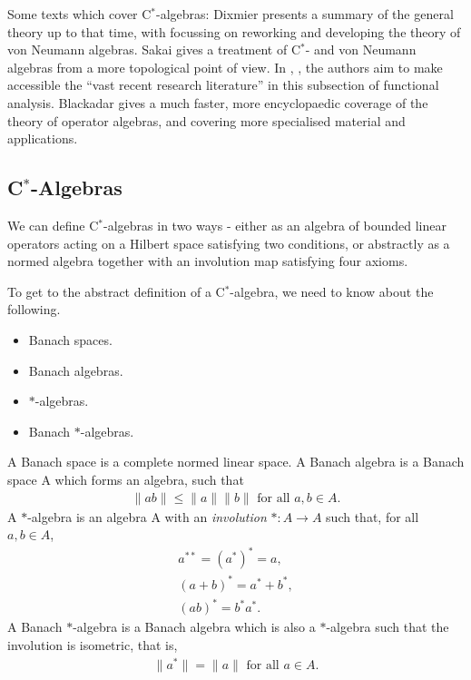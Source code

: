 \documentclass[12pt,a4paper]{amsart}
\theoremstyle{plain}
\theoremstyle{definition}
\begin{document}
	Some texts which cover C$^\ast$-algebras: 
	Dixmier \cite{dixmier77} presents a summary of the general theory up to that time, with \cite{dixmier81} focussing on reworking and developing the theory of von Neumann algebras. 
	Sakai \cite{sakai71} gives a treatment of C$^\ast$- and von Neumann algebras from a more topological point of view.
	In \cite{kadison83}, \cite{kadison86}, the authors aim to make accessible the ``vast recent research literature'' in this subsection of functional analysis.
	Blackadar \cite{blackadar06} gives a much faster, more encyclopaedic coverage of the theory of operator algebras, and covering more specialised material and applications.
	

	
\subsection{C$^\ast$-Algebras}
We can define C$^\ast$-algebras in two ways - either as an algebra of bounded linear operators acting on a Hilbert space satisfying two conditions, or abstractly as a normed algebra together with an involution map satisfying four axioms.

\iftrue
	To get to the abstract definition of a C$^\ast$-algebra, we need to know about the following.
\begin{itemize}
	\item Banach spaces.
	\item Banach algebras.
	\item $\ast$-algebras.
	\item Banach $\ast$-algebras.
\end{itemize}

A Banach space is a complete normed linear space. 
A Banach algebra is a Banach space A which forms an algebra, such that 
\begin{align*}
	\|ab\| \leq \|a\| \|b\| \mbox{ for all } a,b \in A.
\end{align*}
A $\ast$-algebra is an algebra A with an \emph{involution} $\ast : A \to A $ such that, for all $a,b \in A$,
\begin{align*}
	 a^{\ast\ast} = (a^\ast)^\ast = a,\\
	(a+b)^\ast = a^\ast + b^\ast,\\	
	(ab)^\ast = b^\ast a^\ast.
\end{align*}
A Banach $\ast$-algebra is a Banach algebra which is also a $\ast$-algebra such that the involution is isometric, that is,
\begin{align*}
	\|a ^\ast \| = \|a\| \mbox{ for all } a \in A.
\end{align*}
\fi
\end{document}
